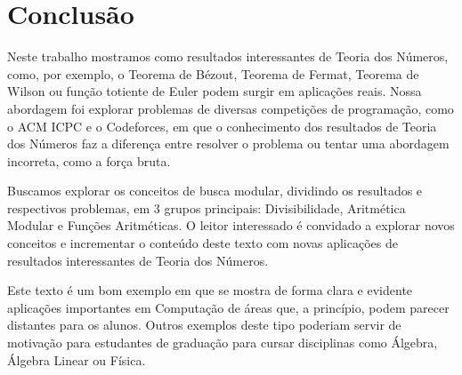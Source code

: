
\chapter{Conclusão} %

\label{Chapter5} %


Neste trabalho mostramos como resultados interessantes de Teoria dos
Números, como, por exemplo, o Teorema de Bézout,  Teorema de Fermat,
Teorema de Wilson ou função totiente de Euler podem surgir em
aplicações reais. Nossa abordagem foi explorar problemas de diversas
competições de programação, como o ACM ICPC e o Codeforces, em que o
conhecimento dos resultados de Teoria dos Números faz a diferença
entre resolver o problema ou tentar uma abordagem incorreta, como a
força bruta.

Buscamos explorar os conceitos de busca modular, dividindo os
resultados e respectivos problemas, em 3 grupos principais:
Divisibilidade, Aritmética Modular e Funções Aritméticas. O leitor
interessado é convidado a explorar novos conceitos e incrementar o
conteúdo deste texto com novas aplicações de resultados interessantes
de Teoria dos Números.

Este texto é um bom exemplo em que se mostra de forma clara e evidente
aplicações importantes em Computação de áreas que, a princípio, podem
parecer distantes para os alunos. Outros exemplos deste tipo poderiam
servir de motivação para estudantes de graduação para cursar
disciplinas como Álgebra, Álgebra Linear ou Física.




